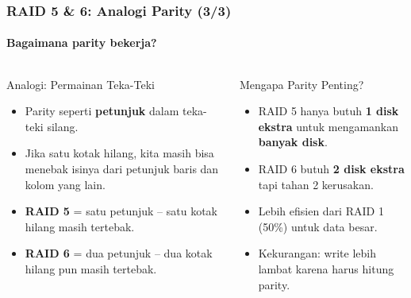 \documentclass[t,aspectratio=169,xcolor=dvipsnames]{beamer}
\begin{document}
\begin{frame}[shrink=5]
    \frametitle{RAID 5 \& 6: Analogi Parity (3/3)}
    \framesubtitle{Bagaimana parity bekerja?}

    \begin{columns}[T]
        \begin{exampleblock}{Analogi: Permainan Teka-Teki}
            \small
            \begin{itemize}
                \item Parity seperti \textbf{petunjuk} dalam teka-teki silang.
                \item Jika satu kotak hilang, kita masih bisa menebak isinya dari petunjuk baris dan kolom yang lain.
                \item \textbf{RAID 5} = satu petunjuk -- satu kotak hilang masih tertebak.
                \item \textbf{RAID 6} = dua petunjuk -- dua kotak hilang pun masih tertebak.
            \end{itemize}
        \end{exampleblock}

        \begin{block}{Mengapa Parity Penting?}
            \small
            \begin{itemize}
                \item RAID 5 hanya butuh \textbf{1 disk ekstra} untuk mengamankan \textbf{banyak disk}.
                \item RAID 6 butuh \textbf{2 disk ekstra} tapi tahan 2 kerusakan.
                \item Lebih efisien dari RAID 1 (50\%) untuk data besar.
                \item Kekurangan: write lebih lambat karena harus hitung parity.
            \end{itemize}
        \end{block}
    \end{columns}
\end{frame}
\end{document}
